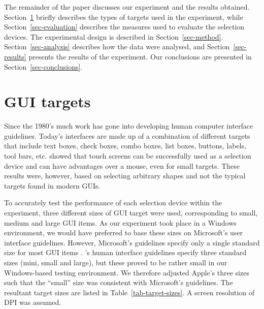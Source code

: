 \documentclass[reviewcopy]{elsart}
\begin{document}
The remainder of the paper discusses our experiment and the results
obtained. Section~\ref{sec-GUI} briefly describes the types of targets
used in the experiment, while Section~\ref{sec-evaluation} describes the
measures used to evaluate the selection devices. The experimental design
is described in Section~\ref{sec-method}. Section~\ref{sec-analysis}
describes how the data were analysed, and Section~\ref{sec-results}
presents the results of the experiment. Our conclusions are presented in
Section~\ref{sec-conclusions}.


\section{GUI targets}
\label{sec-GUI}

Since the 1980's much work has gone into developing human computer
interface guidelines. Today's interfaces are made up of a combination of
different targets that include text boxes, check boxes, combo boxes,
list boxes, buttons, labels, tool bars, etc. \citet{Sear-A-1991-IJMMS}
showed that touch screens can be successfully used as a selection device
and can have advantages over a mouse, even for small targets. These
results were, however, based on selecting arbitrary shapes and not the
typical targets found in modern GUIs.

To accurately test the performance of each selection device within the
experiment, three different sizes of GUI target were used, corresponding
to small, medium and large GUI items. As our experiment took place in a
Windows environment, we would have preferred to base these sizes on
Microsoft's user interface guidelines. However, Microsoft's guidelines
specify only a single standard size for most GUI items \citep[pp.\
448--450]{MS-1999-UI}. \citeauthor{Appl-2004-HIG}'s
\citeyearpar{Appl-2004-HIG} human interface guidelines specify three
standard sizes (mini, small and large), but these proved to be rather
small in our Windows-based testing environment. We therefore adjusted
Apple's three sizes such that the ``small'' size was consistent with
Microsoft's guidelines. The resultant target sizes are listed in
Table~\ref{tab-target-sizes}. A screen resolution of \unit[81]{DPI} was
assumed.
\end{document}
